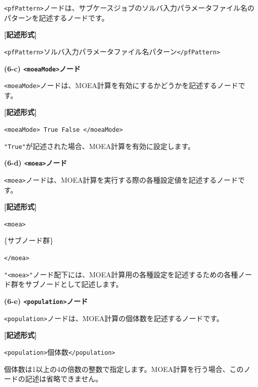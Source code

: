 \documentclass[a4paper,11pt]{jarticle}
\begin{document}
{\texttt{<pfPattern>}ノードは、サブケースジョブのソルバ入力パラメータファイル名のパターンを記述するノードです。

\vspace{8pt}
\leftskip=12pt
\textbf{[記述形式]}

\leftskip=42pt
\texttt{<pfPattern>}ソルバ入力パラメータファイル名パターン\texttt{</pfPattern>}

\vspace{12pt}
\leftskip=0pt
\textbf{(6-c) \texttt{<moeaMode>}ノード}

\texttt{<moeaMode>}ノードは、MOEA計算を有効にするかどうかを記述するノードです。

\vspace{8pt}
\leftskip=12pt
\textbf{[記述形式]}

\leftskip=42pt
\texttt{<moeaMode> True \textbar{} False </moeaMode>}

\vspace{8pt}
\leftskip=0pt
\texttt{"True"}が記述された場合、MOEA計算を有効に設定します。

\vspace{12pt}
\leftskip=0pt
\textbf{(6-d) \texttt{<moea>}ノード}

\texttt{<moea>}ノードは、MOEA計算を実行する際の各種設定値を記述するノードです。

\vspace{8pt}
\leftskip=12pt
\textbf{[記述形式]}

\leftskip=42pt
\texttt{<moea>}

\parindent=14pt
\{サブノード群\}

\parindent=0pt
\texttt{</moea>}

\vspace{8pt}
\leftskip=0pt
\texttt{"<moea>"}ノード配下には、MOEA計算用の各種設定を記述するための各種ノード群をサブノードとして記述します。

\vspace{12pt}
\textbf{(6-e) \texttt{<population>}ノード}

\texttt{<population>}ノードは、MOEA計算の個体数を記述するノードです。

\vspace{8pt}
\leftskip=12pt
\textbf{[記述形式]}

\leftskip=42pt
\texttt{<population>}個体数\texttt{</population>}

\vspace{8pt}
\leftskip=0pt
個体数は1以上の4の倍数の整数で指定します。MOEA計算を行う場合、このノードの記述は省略できません。

}
\end{document}
